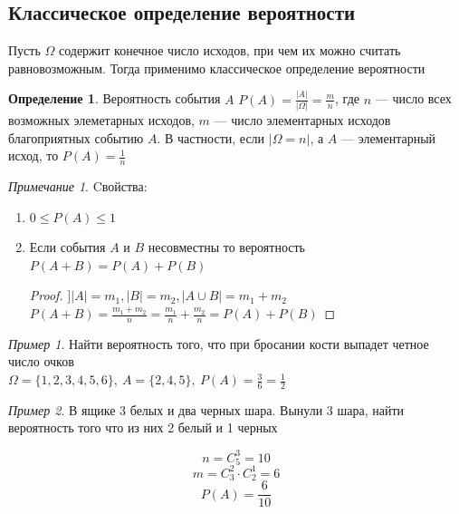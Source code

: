 \documentclass[oneside]{book}
\theoremstyle{plain}
\theoremstyle{remark}
\newtheorem*{remark}{Примечание}
\newtheorem*{examp}{Пример}
\theoremstyle{definition}
\newtheorem*{definition}{Определение}
\begin{document}
\subsection{Классическое определение вероятности}
\label{sec:orgaadc99a}
Пусть \(\Omega\) содержит конечное число исходов, при чем их можно считать равновозможным.
Тогда применимо классическое определение вероятности
\begin{definition}
Вероятность события \(A\) \(P(A) = \frac{|A|}{|\Omega|} = \frac{m}{n}\), где \(n\) --- число всех возможных элеметарных
исходов, \(m\) --- число элементарных исходов благоприятных событию \(A\). В частности, если \(|\Omega = n|\), а \(A\) --- элементарный исход, то \(P(A) = \frac{1}{n}\)
\end{definition}
\begin{remark}
Cвойства:
\begin{enumerate}
\item \(0 \le P(A) \le 1\)
\setcounter{enumi}{3}
\item Если события \(A\) и \(B\) несовместны то вероятность \(P(A + B) = P(A) + P(B)\)
\begin{proof}
\(] |A| = m_1, |B| = m_2, |A\cup B| = m_1 + m_2\) \\
\(P(A + B) = \frac{m_1 + m_2}{n} = \frac{m_1}{n} + \frac{m_2}{n} = P(A) + P(B)\)
\end{proof}
\end{enumerate}
\end{remark}
\begin{examp}
Найти вероятность того, что при бросании кости выпадет четное число очков \\
\(\Omega = \{1, 2, 3, 4, 5, 6\},\ A = \{ 2, 4, 5\},\ P(A) = \frac{3}{6} = \frac{1}{2}\) 
\end{examp}
\begin{examp}
В ящике 3 белых и два черных шара. Вынули 3 шара, найти вероятность того что из них 2 белый и 1 черных
\begin{center}
\end{center}

\[ n = C^3_5 = 10 \]
\[ m = C^2_3\cdot C^1_2 = 6 \]
\[ P(A) = \frac{6}{10} \]
\end{examp}
\end{document}
